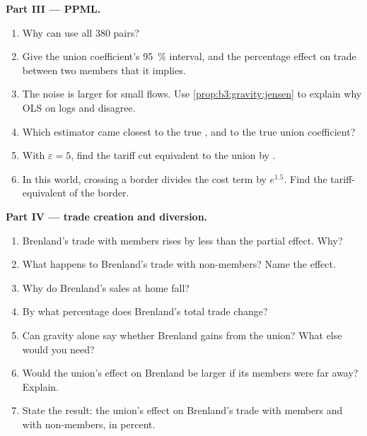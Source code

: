 \begin{problem}
\medskip\noindent\textbf{Part III --- PPML.}
\begin{enumerate}[resume]
\item Why can  use all 380 pairs?
\item Give the  union coefficient's 95~\% interval, and the percentage effect
on trade between two members that it implies.
\item The noise is larger for small flows. Use \cref{prop:b3:gravity:jensen} to
explain why OLS on logs and  disagree.
\item Which estimator came closest to the true , and to the
true union coefficient?
\item With $\varepsilon = 5$, find the tariff cut equivalent to the union by .
\item In this world, crossing a border divides the cost term by $e^{1.5}$. Find the
tariff-equivalent of the border.
\end{enumerate}

\medskip\noindent\textbf{Part IV --- trade creation and diversion.}
\begin{enumerate}[resume]
\item Brenland's trade with members rises by less than the  partial effect.
Why?
\item What happens to Brenland's trade with non-members? Name the effect.
\item Why do Brenland's sales at home fall?
\item By what percentage does Brenland's total trade change?
\item Can gravity alone say whether Brenland gains from the union? What else
would you need?
\item Would the union's effect on Brenland be larger if its members were far
away? Explain.
\item State the result: the union's effect on Brenland's trade with members and
with non-members, in percent.
\end{enumerate}
\end{problem}
